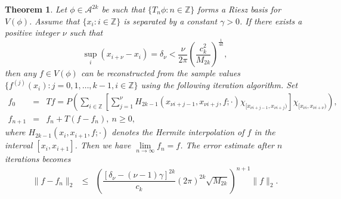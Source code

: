 \documentclass[a4paper,12pt,reqno]{amsart}
\theoremstyle{plain}
\newtheorem{thm}{Theorem}[section]
\numberwithin{equation}{section}
\theoremstyle{definition}
\begin{document}
\begin{thm}\label{pap3thm2.2}
Let $\phi\in\mathcal{A}^{2k}$ be such that $\{T_{n}\phi:n\in\mathbb{Z}\}$ forms a Riesz basis for $V(\phi)$. Assume that $\{x_i:{i\in\mathbb{Z}}\}$ is separated by a constant $\gamma>0$.
If there exists a positive  integer $\nu$ such that 
$$\sup\limits_i(x_{i+\nu}-x_i)=\delta_\nu<\dfrac{\nu}{2\pi}\left(\dfrac{c_{k}^2}{M_{2k}}\right)^{\frac{1}{4k}},$$ then 
any $f\in V(\phi)$ can be reconstructed from the sample values $\{f^{(j)}(x_i):j=0,1,\dots,k-1,i\in\mathbb{Z}\}$ using the following iteration algorithm.
Set
\begin{eqnarray*}
f_0&=&Tf=P\left(\sum\limits_{i\in\mathbb{Z}}\left[\sum\limits_{j=1}^{\nu}H_{2k-1}(x_{\nu i+j-1},x_{\nu i+j},f;\cdot)\chi_{[x_{\nu i+j-1},x_{\nu i+j})}\right]\chi_{[x_{\nu i},x_{\nu i+\nu})}\right),\\
f_{n+1}&=&f_n+T(f-f_n),~ n\geq 0,
\end{eqnarray*}
where $H_{2k-1}(x_i,x_{i+1},f;\cdot)$ denotes the Hermite interpolation of $f$ in the interval $[x_i,x_{i+1}]$.
Then we have $\lim\limits_{n\to\infty}f_n=f$. The error estimate after $n$ iterations becomes
\begin{eqnarray*}
\|f-f_n\|_2&\leq&\left(\dfrac{[\delta_\nu-(\nu-1) \gamma]^{2k}}{c_{k}}(2\pi)^{2k}\sqrt{M_{2k}}\right)^{n+1}\|f\|_2.
\end{eqnarray*}
\end{thm}
\end{document}
